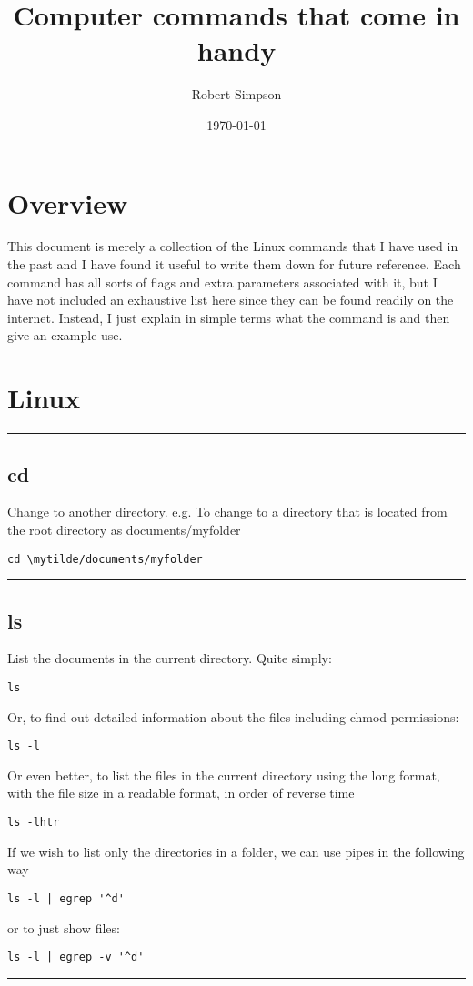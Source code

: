 \documentclass[a4paper, 10pt]{article}
\title{Computer commands that come in handy}
\author{Robert Simpson}
\date{\today}
\newcommand{\mytilde}{$\sim$}
\newcommand{\mytoprule}{\hrule\vspace{4mm}}
\newcommand{\mybotrule}{\vspace{4mm}\hrule}
\begin{document}
\maketitle

\section*{Overview}
This document is merely a collection of the Linux commands that I have used in the past and I have found it useful to write them down for future reference. Each command has all sorts of flags and extra parameters associated with it, but I have not included an exhaustive list here since they can be found readily on the internet. Instead, I just explain in simple terms what the command is and then give an example use.

\section*{Linux}

\mytoprule
\subsection*{cd}
Change to another directory. e.g. To change to a directory that is located from the root directory as documents/myfolder
\begin{Verbatim}[commandchars=\\\{\}]
cd \mytilde/documents/myfolder
\end{Verbatim}
\mybotrule

\subsection*{ls}
List the documents in the current directory. Quite simply:
\begin{verbatim}
ls
\end{verbatim}
Or, to find out detailed information about the files including chmod permissions:
\begin{verbatim}
ls -l
\end{verbatim}
Or even better, to list the files in the current directory using the long format, with the file size in a readable format, in order of reverse time
\begin{verbatim}
ls -lhtr
\end{verbatim}
If we wish to list only the directories in a folder, we can use pipes in the following way
\begin{verbatim}
ls -l | egrep '^d'
\end{verbatim}
or to just show files:
\begin{verbatim}
ls -l | egrep -v '^d'
\end{verbatim}
\mybotrule
\end{document}
